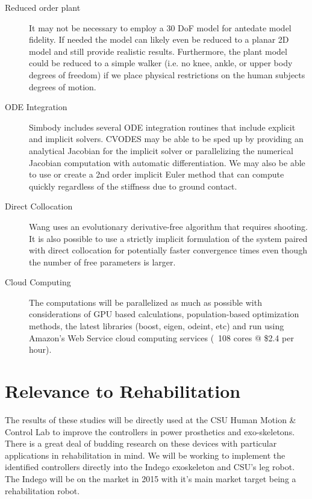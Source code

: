 \documentclass[11pt]{article}
\begin{document}
\begin{description}
  \item[Reduced order plant] It may not be necessary to employ a 30 DoF model
    for antedate model fidelity. If needed the model can likely even be reduced
    to a planar 2D model and still provide realistic results. Furthermore, the
    plant model could be reduced to a simple walker (i.e. no knee, ankle, or
    upper body degrees of freedom) if we place physical restrictions on the
    human subjects degrees of motion.
  \item[ODE Integration] Simbody includes several ODE integration routines that
    include explicit and implicit solvers. CVODES may be able to be sped up by
    providing an analytical Jacobian for the implicit solver or parallelizing
    the numerical Jacobian computation with automatic differentiation. We may
    also be able to use or create a 2nd order implicit Euler method that can
    compute quickly regardless of the stiffness due to ground contact.
  \item[Direct Collocation] Wang uses an evolutionary derivative-free
    algorithm that requires shooting. It is also possible to use a strictly
    implicit formulation of the system paired with direct collocation for
    potentially faster convergence times even though the number of free
    parameters is larger.
  \item[Cloud Computing] The computations will be parallelized as much as
    possible with considerations of GPU based calculations, population-based
    optimization methods, the latest libraries (boost, eigen, odeint, etc) and
    run using Amazon's Web Service cloud computing services (~108 cores @ \$2.4
    per hour).
\end{description}

\section*{Relevance to Rehabilitation}

The results of these studies will be directly used at the CSU Human Motion \&
Control Lab to improve the controllers in power prosthetics and exo-skeletons.
There is a great deal of budding research on these devices with particular
applications in rehabilitation in mind. We will be working to implement the
identified controllers directly into the Indego exoskeleton and CSU's leg
robot. The Indego will be on the market in 2015 with it's main market target
being a rehabilitation robot.
\end{document}
